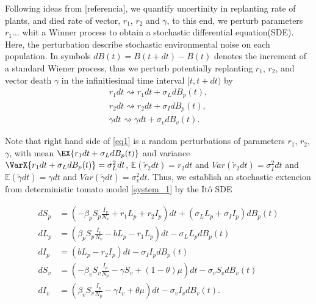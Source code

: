 %
Following ideas from [referencia], we quantify uncertinity in replanting rate of
plants, and  died rate of vector, $r_1$, $r_2$ and $\gamma$, to this end, we
perturb parameters   $r_1 \dots$ whit a Winner
process to obtain a stochastic differential equation(SDE). Here, the 
perturbation describe stochastic environmental noise on each population. In
symbols $ dB(t)=B(t+dt)-B(t)$ denotes the increment of a standard Wiener
process, thus we perturb potentially replanting $r_1$, $r_2$, and vector death
$\gamma$ in the infinitiesimal time interval $[t, t + dt)$ by
\begin{equation}
	\label{eq1}
	\begin{aligned}
		{r}_1 dt \rightsquigarrow r_1 dt + \sigma_L dB_p(t),
		\\
		{r}_2 dt \rightsquigarrow r_2 dt + \sigma_Id B_p(t),
		\\
		\gamma dt \rightsquigarrow \gamma dt + \sigma_vd B_v(t).
	\end{aligned}
\end{equation}

	Note that right hand side of \eqref{eq1} is a random perturbations of parameters
$r_1$, $r_2$, $\gamma$, with mean
$
	\EX{r_1 dt + \sigma_L dB_p(t)}
$
and variance 
$
	\VarX{r_1 dt + \sigma_L dB_p(t)} = \sigma_L^2dt
$, 
$
	\mathbb{E}(\tilde{r}_2dt) = r_2dt
$ 
and
$
	Var(\tilde{r}_2dt) = \sigma_I^2dt
$ 
and 
$
	\mathbb{E}(\tilde{\gamma}dt) = \gamma dt
$ and 
$
	Var(\tilde{\gamma}dt) = \sigma_v^2dt
$.
%
Thus, we establish an stochastic extencion from deterministic tomato model 
\eqref{system_1} by the It\^{o} SDE

\begin{equation}
	\label{system_3}
	\begin{aligned}
		d S_p &=
			\left(
				-\beta_p S_p \frac{I_v}{N_v} + r_1 L_p + r_2 I_p
			\right)dt 
			+ (\sigma_L L_p
			+ 
			\sigma_I I_p)dB_p(t) 
		\\
		dL_p &=
			\left(
				\beta_p S_p \frac{I_v}{N_v} - b L_p - r_1 L_p
			\right) dt 
			- \sigma_L L_p dB_p(t) 
		\\
		d I_p &=
			\left(
				b L_p - r_2 I_p
			\right) dt 
			- \sigma_I I_p dB_p(t) 
		\\
		dS_v &=
			\left(
				-\beta_v S_v \frac{I_p}{N_p} - \gamma S_v  + (1-\theta) \mu
			\right)dt - \sigma_v S_v dB_v(t) 
		\\
		d I_v &=
			\left(
				\beta_v S_v \frac{I_p}{N_p} -\gamma I_v + \theta \mu
			\right) dt 
			- \sigma_v I_v dB_v(t).
	\end{aligned}
\end{equation}

